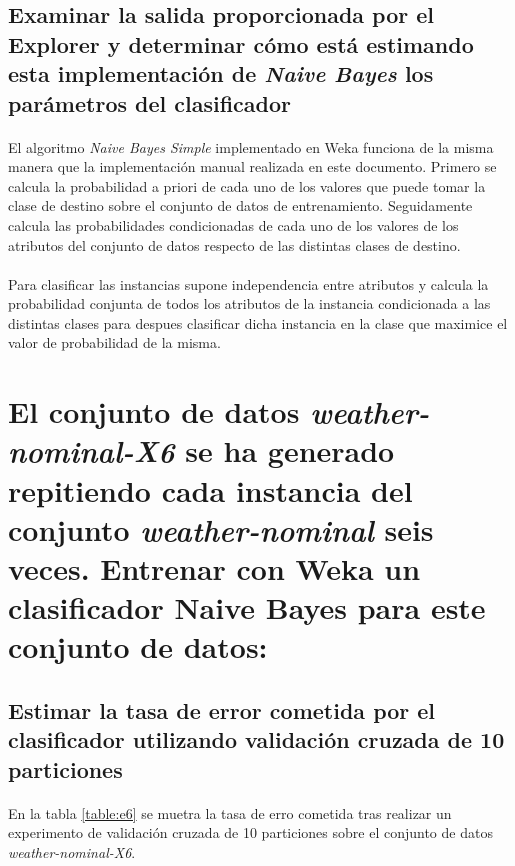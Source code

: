 \documentclass{article}
\begin{document}
		\subsection{Examinar la salida proporcionada por el Explorer y determinar cómo está estimando esta implementación de \emph{Naive Bayes} los parámetros del clasificador}

			\paragraph{}
			El algoritmo \emph{Naive Bayes Simple} implementado en Weka funciona de la misma manera que la implementación manual realizada en este documento. Primero se calcula la probabilidad a priori de cada uno de los valores que puede tomar la clase de destino sobre el conjunto de datos de entrenamiento. Seguidamente calcula las probabilidades condicionadas de cada uno de los valores de los atributos del conjunto de datos respecto de las distintas clases de destino.

			\paragraph{}
			Para clasificar las instancias supone independencia entre atributos y calcula la probabilidad conjunta de todos los atributos de la instancia condicionada a las distintas clases para despues clasificar dicha instancia en la clase que maximice el valor de probabilidad de la misma.

	\section{El conjunto de datos \emph{weather-nominal-X6} se ha generado repitiendo cada instancia del conjunto \emph{weather-nominal} seis veces. Entrenar con Weka un clasificador Naive Bayes para este conjunto de datos:}
	\label{sec:e6}

		\subsection{Estimar la tasa de error cometida por el clasificador utilizando validación cruzada de 10 particiones}

			\paragraph{}
			En la tabla \ref{table:e6} se muetra la tasa de erro cometida tras realizar un experimento de validación cruzada de 10 particiones sobre el conjunto de datos \emph{weather-nominal-X6}.
\end{document}
